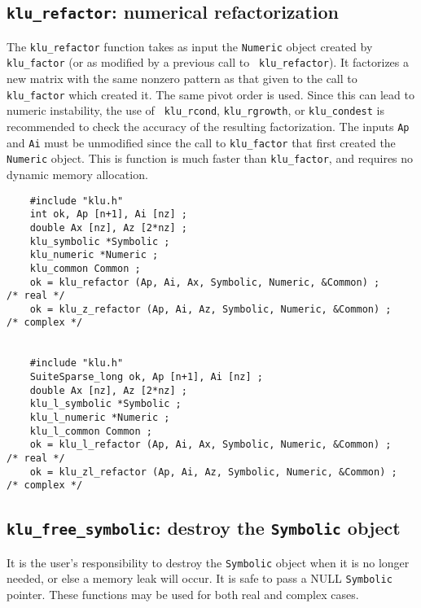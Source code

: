 \documentclass[11pt]{article}
\begin{document}
\subsection{{\tt klu\_refactor}: numerical refactorization}

The {\tt klu\_refactor} function takes as input the {\tt Numeric} object
created by {\tt klu\_factor} (or as modified by a previous call to {\tt
klu\_refactor}).  It factorizes a new matrix with the same nonzero pattern as
that given to the call to {\tt klu\_factor} which created it.  The same pivot
order is used.  Since this can lead to numeric instability, the use of {\tt
klu\_rcond}, {\tt klu\_rgrowth}, or {\tt klu\_condest} is recommended to check
the accuracy of the resulting factorization.  The inputs {\tt Ap} and {\tt Ai}
must be unmodified since the call to {\tt klu\_factor} that first created the
{\tt Numeric} object.  This is function is much faster than {\tt klu\_factor},
and requires no dynamic memory allocation.

{\footnotesize
\begin{verbatim}
    #include "klu.h"
    int ok, Ap [n+1], Ai [nz] ;
    double Ax [nz], Az [2*nz] ;
    klu_symbolic *Symbolic ;
    klu_numeric *Numeric ;
    klu_common Common ;
    ok = klu_refactor (Ap, Ai, Ax, Symbolic, Numeric, &Common) ;                      /* real */
    ok = klu_z_refactor (Ap, Ai, Az, Symbolic, Numeric, &Common) ;                    /* complex */


    #include "klu.h"
    SuiteSparse_long ok, Ap [n+1], Ai [nz] ;
    double Ax [nz], Az [2*nz] ;
    klu_l_symbolic *Symbolic ;
    klu_l_numeric *Numeric ;
    klu_l_common Common ;
    ok = klu_l_refactor (Ap, Ai, Ax, Symbolic, Numeric, &Common) ;                    /* real */
    ok = klu_zl_refactor (Ap, Ai, Az, Symbolic, Numeric, &Common) ;                   /* complex */
\end{verbatim}
}

\subsection{{\tt klu\_free\_symbolic}: destroy the {\tt Symbolic} object}

It is the user's responsibility to destroy the {\tt Symbolic} object when it is
no longer needed, or else a memory leak will occur.  It is safe to pass a NULL
{\tt Symbolic} pointer.  These functions may be used for both real and complex
cases.
\end{document}
